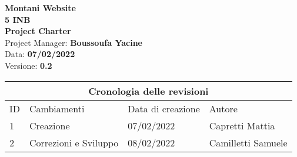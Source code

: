 \documentclass{article}
\begin{document}
	
	
	\begin{titlepage}
		\begin{center}
			\huge\textbf{Montani Website}\\
			\Large\textbf{5 INB}\\
			\Large \textbf{Project Charter}\\
			\vspace{4cm}
			\large Project Manager: \textbf{Boussoufa Yacine}\\
			\large Data: \textbf{07/02/2022}\\
			\large Versione: \textbf{0.2}\\
		\end{center}
	\end{titlepage}
	
	\clearpage
	
	\begin{tabular}{ |p{1cm}|p{4cm}|p{3cm}|p{2cm}|  }
		\hline
		\multicolumn{4}{|c|}{Cronologia delle revisioni} \\
		\hline
		ID& Cambiamenti &Data di creazione&Autore\\
		\hline
		1   & Creazione    &07/02/2022&   Capretti Mattia\\
		\hline
		2   & Correzioni e Sviluppo    &08/02/2022&   Camilletti Samuele\\
		\hline
	\end{tabular}
	
	\clearpage
	
	\tableofcontents
	
	
	
	\printindex
	
	
\end{document}
